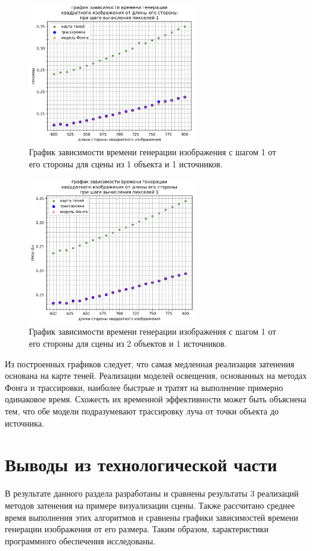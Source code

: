 \begin{figure}[H]
	\centering
	\includegraphics[width=0.65\textwidth]{img/1obj_1src.png}
	\caption{
        График зависимости времени генерации изображения с шагом 1 от его стороны
        для сцены из 1 объекта и 1 источников.
    }
	\label{fig:1obj_1src}
\end{figure}

\begin{figure}[H]
	\centering
	\includegraphics[width=0.65\textwidth]{img/2obj_1src.png}
	\caption{
        График зависимости времени генерации изображения с шагом 1 от его стороны
        для сцены из 2 объектов и 1 источников.
    }
	\label{fig:2obj_1src}
\end{figure}

Из построенных графиков следует, что самая медленная
реализация затенения основана на карте теней.
Реализации моделей освещения, основанных на методах Фонга и трассировки,
наиболее быстрые и тратят на выполнение примерно одинаковое время.
Схожесть их временной эффективности может быть объяснена тем, что обе
модели подразумевают трассировку луча от точки объекта до источника.

\section*{Выводы из технологической части}
В результате данного раздела разработаны и сравнены результаты
3 реализаций методов затенения на примере визуализации сцены.
Также рассчитано среднее время выполнения этих алгоритмов и сравнены
графики зависимостей времени генерации изображения от его размера.
Таким образом, характеристики программного обеспечения исследованы.